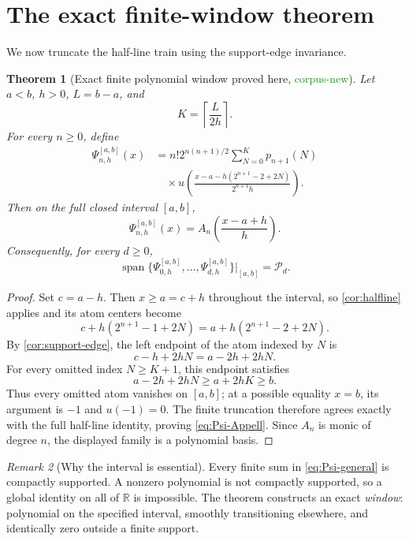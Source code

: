 \documentclass[11pt]{article}
\newtheorem{theorem}{Theorem}[section]
\theoremstyle{definition}
\theoremstyle{remark}
\newtheorem{remark}[theorem]{Remark}
\DeclareMathOperator{\spanop}{span}
\newcommand{\R}{\mathbb{R}}
\newcommand{\Pp}{\mathcal{P}}
\newcommand{\1}{\mathbf{1}}
\newcommand{\CorpusNew}{\textcolor{ForestGreen}{\textsf{corpus-new}}}
\newcommand{\ProvedHere}{\textcolor{BrickRed}{\textsf{proved here}}}
\begin{document}
\section{The exact finite-window theorem}

We now truncate the half-line train using the support-edge invariance.

\begin{theorem}[Exact finite polynomial window \ProvedHere, \CorpusNew]
\label{thm:finite-window}
Let $a<b$, $h>0$, $L=b-a$, and
\begin{equation}
 K=\left\lceil\frac{L}{2h}\right\rceil.
 \label{eq:K}
\end{equation}
For every $n\geq0$, define
\begin{equation}
\boxed{
\begin{aligned}
 \Psi_{n,h}^{[a,b]}(x)
 &=n!2^{n(n+1)/2}\sum_{N=0}^{K}p_{n+1}(N)\\[-0.2em]
 &\quad\times
 u\!\left(
 \frac{x-a-h(2^{n+1}-2+2N)}{2^{n+1}h}
 \right).
\end{aligned}}
\label{eq:Psi-general}
\end{equation}
Then on the full closed interval $[a,b]$,
\begin{equation}
 \Psi_{n,h}^{[a,b]}(x)
 =A_n\!\left(\frac{x-a+h}{h}\right).
 \label{eq:Psi-Appell}
\end{equation}
Consequently, for every $d\geq0$,
\begin{equation}
 \spanop\{\Psi_{0,h}^{[a,b]},\ldots,
 \Psi_{d,h}^{[a,b]}\}\big|_{[a,b]}=\Pp_d.
 \label{eq:basis-Pd}
\end{equation}
\end{theorem}

\begin{proof}
Set $c=a-h$.  Then $x\geq a=c+h$ throughout the interval, so
\cref{cor:halfline} applies and its atom centers become
\[
 c+h(2^{n+1}-1+2N)
 =a+h(2^{n+1}-2+2N).
\]
By \cref{cor:support-edge}, the left endpoint of the atom indexed by $N$ is
\[
 c-h+2hN=a-2h+2hN.
\]
For every omitted index $N\geq K+1$, this endpoint satisfies
\[
 a-2h+2hN\geq a+2hK\geq b.
\]
Thus every omitted atom vanishes on $[a,b]$; at a possible equality $x=b$,
its argument is $-1$ and $u(-1)=0$.  The finite truncation therefore agrees
exactly with the full half-line identity, proving \eqref{eq:Psi-Appell}.
Since $A_n$ is monic of degree $n$, the displayed family is a polynomial basis.
\end{proof}

\begin{remark}[Why the interval is essential]
Every finite sum in \eqref{eq:Psi-general} is compactly supported.  A nonzero
polynomial is not compactly supported, so a global identity on all of $\R$ is
impossible.  The theorem constructs an exact \emph{window}: polynomial on the
specified interval, smoothly transitioning elsewhere, and identically zero
outside a finite support.
\end{remark}
\end{document}
